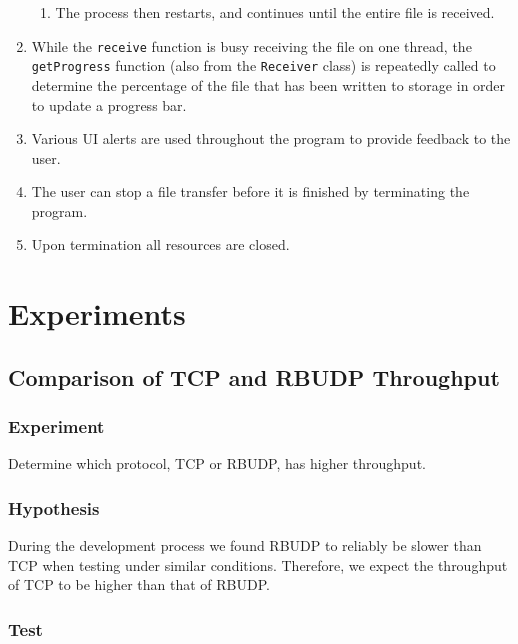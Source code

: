 \documentclass[10pt, a4paper]{article}
\begin{document}
\begin{enumerate}
\begin{enumerate}
      \item The process then restarts, and continues until the entire file is
        received.
    \end{enumerate}
  \item While the \texttt{receive} function is busy receiving the file on one
    thread, the \texttt{getProgress} function (also from the \texttt{Receiver}
    class) is repeatedly called to determine the percentage of the file that
    has been written to storage in order to update a progress bar.
  \item Various UI alerts are used throughout the program to provide feedback to
    the user.
  \item The user can stop a file transfer before it is finished by terminating
    the program.
  \item Upon termination all resources are closed.
\end{enumerate}


\section{Experiments}
\label{sec:exp}

\subsection{Comparison of TCP and RBUDP Throughput}
\label{subsec:comp-tcp-rbudp-throughput}

\subsubsection{Experiment}
\label{subsubsec:exp-1}

Determine which protocol, TCP or RBUDP, has higher throughput.

\subsubsection{Hypothesis}
\label{subsubsec:exp-1}

During the development process we found RBUDP to reliably be slower than TCP
when testing under similar conditions. Therefore, we expect the throughput of
TCP to be higher than that of RBUDP.

\subsubsection{Test}
\label{subsubsec:test-1}
\end{document}
